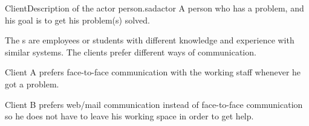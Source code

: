 \begin{sadlist}{Client}{Description of the actor person.}{sadactor}
 A person who has a problem, and his goal is to get his problem(s) solved.

 The \client{}s are employees or students with different knowledge and experience with similar systems. The clients prefer different ways of communication.%

 Client A prefers face-to-face communication with the working staff whenever he got a problem. 

Client B prefers web/mail communication instead of face-to-face communication so he does not have to leave his working space in order to get help. 

\end{sadlist}
